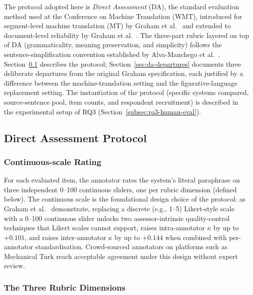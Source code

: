 The protocol adopted here is \textit{Direct Assessment} (DA), the standard evaluation method used at the Conference on Machine Translation (WMT), introduced for segment-level machine translation (MT) by Graham et al.\ \cite{Graham2013} and extended to document-level reliability by Graham et al.\ \cite{Graham2017}. The three-part rubric layered on top of DA (grammaticality, meaning preservation, and simplicity) follows the sentence-simplification convention established by Alva-Manchego et al.\ \cite{Alva-Manchego2020}. Section~\ref{sec:da-protocol} describes the protocol; Section~\ref{sec:da-departures} documents three deliberate departures from the original Graham specification, each justified by a difference between the machine-translation setting and the figurative-language replacement setting. The instantiation of the protocol (specific systems compared, source-sentence pool, item counts, and respondent recruitment) is described in the experimental setup of RQ3 (Section~\ref{subsec:rq3-human-eval}).

\subsection{Direct Assessment Protocol}
\label{sec:da-protocol}

\subsubsection{Continuous-scale Rating}

For each evaluated item, the annotator rates the system's literal paraphrase on three independent 0--100 continuous sliders, one per rubric dimension (defined below). The continuous scale is the foundational design choice of the protocol: as Graham et al.\ \cite{Graham2013} demonstrate, replacing a discrete (e.g., 1--5) Likert-style scale with a 0--100 continuous slider unlocks two assessor-intrinsic quality-control techniques that Likert scales cannot support, raises intra-annotator $\kappa$ by up to $+0.101$, and raises inter-annotator $\kappa$ by up to $+0.144$ when combined with per-annotator standardisation. Crowd-sourced annotators on platforms such as Mechanical Turk reach acceptable agreement under this design without expert review.

\subsubsection{The Three Rubric Dimensions}

